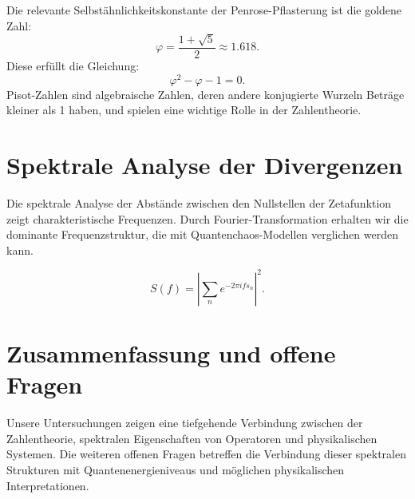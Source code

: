 \documentclass[a4paper,12pt]{article}
\begin{document}
Die relevante Selbstähnlichkeitskonstante der Penrose-Pflasterung ist die goldene Zahl:
\begin{equation}
    \varphi = \frac{1+\sqrt{5}}{2} \approx 1.618.
\end{equation}
Diese erfüllt die Gleichung:
\begin{equation}
    \varphi^2 - \varphi - 1 = 0.
\end{equation}
Pisot-Zahlen sind algebraische Zahlen, deren andere konjugierte Wurzeln Beträge kleiner als 1 haben, und spielen eine wichtige Rolle in der Zahlentheorie.

\section{Spektrale Analyse der Divergenzen}
Die spektrale Analyse der Abstände zwischen den Nullstellen der Zetafunktion zeigt charakteristische Frequenzen. Durch Fourier-Transformation erhalten wir die dominante Frequenzstruktur, die mit Quantenchaos-Modellen verglichen werden kann.

\begin{equation}
    S(f) = \left| \sum_{n} e^{-2\pi i f s_n} \right|^2.
\end{equation}

\section{Zusammenfassung und offene Fragen}
Unsere Untersuchungen zeigen eine tiefgehende Verbindung zwischen der Zahlentheorie, spektralen Eigenschaften von Operatoren und physikalischen Systemen. Die weiteren offenen Fragen betreffen die Verbindung dieser spektralen Strukturen mit Quantenenergieniveaus und möglichen physikalischen Interpretationen.
\end{document}
